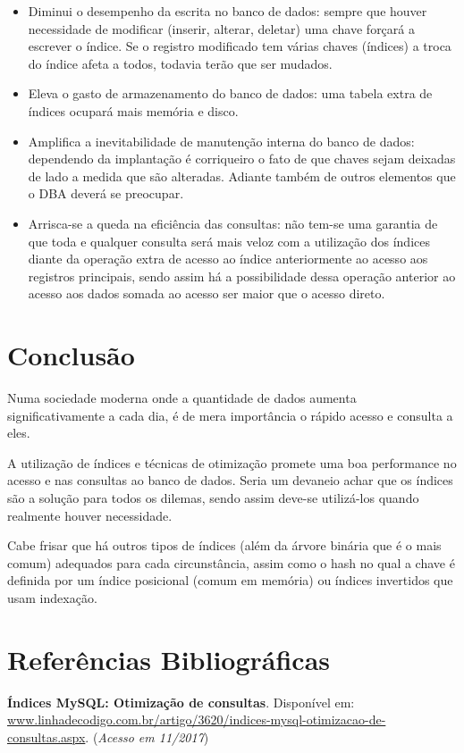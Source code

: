 \documentclass[12pt,a4paper]{article}
\begin{document}
\begin{itemize}
	\item Diminui o desempenho da escrita no banco de dados: sempre que houver necessidade de modificar (inserir, alterar, deletar) uma chave forçará a escrever o índice. Se o registro modificado tem várias chaves (índices) a troca do índice afeta a todos, todavia terão que ser mudados.
	
	\item Eleva o gasto de armazenamento do banco de dados: uma tabela extra de índices ocupará mais memória e disco.
	
	\item Amplifica a inevitabilidade de manutenção interna do banco de dados: dependendo da implantação é corriqueiro o fato de que chaves sejam deixadas de lado a medida que são alteradas. Adiante também de outros elementos que o DBA deverá se preocupar.
	
	\item	Arrisca-se a queda na eficiência das consultas: não tem-se uma garantia de que toda e qualquer consulta será mais veloz com a utilização dos índices diante da operação extra de acesso ao índice anteriormente ao acesso aos registros principais, sendo assim há a possibilidade dessa operação anterior ao acesso aos dados somada ao acesso ser maior que o acesso direto.
	
\end{itemize}

\section{Conclusão}

Numa sociedade moderna onde a quantidade de dados aumenta significativamente a cada dia, é de mera importância o rápido acesso e consulta a eles.

A utilização de índices e técnicas de otimização promete uma boa performance no acesso e nas consultas ao banco de dados. Seria um devaneio achar que os índices são a solução para todos os dilemas, sendo assim deve-se utilizá-los quando realmente houver necessidade.

Cabe frisar que há outros tipos de índices (além da árvore binária que é o mais comum) adequados para cada circunstância, assim como o hash no qual a chave é definida por um índice posicional (comum em memória) ou índices invertidos que usam indexação.

\section{Referências Bibliográficas}
\noindent \textbf{Índices MySQL: Otimização de consultas}. Disponível em: \url {www.linhadecodigo.com.br/artigo/3620/indices-mysql-otimizacao-de-consultas.aspx}. (\textit{Acesso em 11/2017})\\\vspace{0.2cm}
\end{document}

